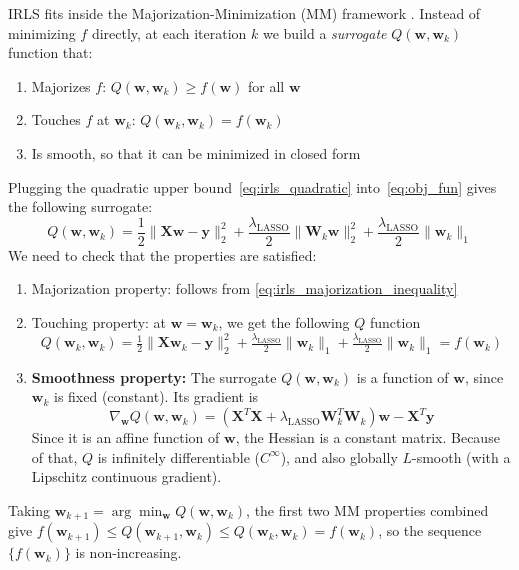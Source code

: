 IRLS fits inside the Majorization-Minimization (MM) framework \cite{nguyen2016introductionmmalgorithmsmachine}. Instead of minimizing $f$ directly, at each iteration $k$ we build a \emph{surrogate} $Q(\mathbf{w}, \mathbf{w}_k)$ function that:
\begin{enumerate}
    \item Majorizes $f$: $Q(\mathbf{w}, \mathbf{w}_k) \ge f(\mathbf{w})$ for all $\mathbf{w}$
    \item Touches $f$ at $\mathbf{w}_k$: $Q(\mathbf{w}_k, \mathbf{w}_k) = f(\mathbf{w}_k)$
    \item Is smooth, so that it can be minimized in closed form
\end{enumerate}
Plugging the quadratic upper bound~\eqref{eq:irls_quadratic} into~\eqref{eq:obj_fun} gives the following surrogate:
\begin{equation}
    Q(\mathbf{w}, \mathbf{w}_k) = \frac{1}{2}\|\mathbf{Xw} - \mathbf{y}\|_2^2
    + \frac{\lambda_{\text{LASSO}}}{2}\|\mathbf{W}_k\mathbf{w}\|_2^2
    + \frac{\lambda_{\text{LASSO}}}{2}\|\mathbf{w}_k\|_1
    \label{eq:irls_surrogate}
\end{equation}
We need to check that the properties are satisfied:
\begin{enumerate}
    \item Majorization property: follows from \eqref{eq:irls_majorization_inequality}
    \item Touching property: at $\mathbf{w} = \mathbf{w}_k$, we get the following $Q$ function
        \[
            Q(\mathbf{w}_k, \mathbf{w}_k)
            = \tfrac{1}{2}\|\mathbf{Xw}_k - \mathbf{y}\|_2^2
            + \tfrac{\lambda_{\text{LASSO}}}{2}\|\mathbf{w}_k\|_1
            + \tfrac{\lambda_{\text{LASSO}}}{2}\|\mathbf{w}_k\|_1
            = f(\mathbf{w}_k)
        \]
    \item \textbf{Smoothness property:} The surrogate $Q(\mathbf{w}, \mathbf{w}_k)$ is a function of $\mathbf{w}$, since $\mathbf{w}_k$ is fixed (constant). Its gradient is 
    \[\nabla_{\mathbf{w}} Q(\mathbf{w}, \mathbf{w}_k) = \left(\mathbf{X}^T\mathbf{X} + \lambda_{\text{LASSO}}\mathbf{W}_k^T\mathbf{W}_k\right)\mathbf{w} - \mathbf{X}^T\mathbf{y}\]
    Since it is an affine function of $\mathbf{w}$, the Hessian is a constant matrix. Because of that, $Q$ is infinitely differentiable ($C^\infty$), and also globally $L$-smooth (with a Lipschitz continuous gradient).
\end{enumerate}

Taking $\mathbf{w}_{k+1} = \arg\min_{\mathbf{w}} Q(\mathbf{w}, \mathbf{w}_k)$, the first two MM properties combined give $f(\mathbf{w}_{k+1}) \le Q(\mathbf{w}_{k+1}, \mathbf{w}_k) \le Q(\mathbf{w}_k, \mathbf{w}_k) = f(\mathbf{w}_k)$, so the sequence $\{f(\mathbf{w}_k)\}$ is non-increasing.

